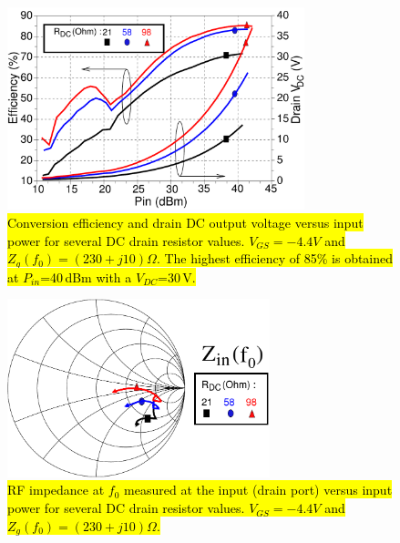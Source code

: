 \documentclass[journal]{IEEEtran}
\begin{document}
\begin{figure}[ht!]
\centering
\includegraphics[width=3.4in]{pdf/13.pdf}
\caption{\hl{Conversion efficiency and drain DC output voltage versus input power for several DC drain resistor values. $V_{GS}=-4.4V$ and $Z_g(f_0)=\left(230+j10\right)\Omega$. The highest efficiency of 85\% is obtained at $P_{in}$=40\,dBm with a $V_{DC}$=30\,V.}}
\label{Rd_sweep_final}
\end{figure}


\begin{figure}[ht!]
\centering
\includegraphics[width=3in]{pdf/14.pdf}
\caption{\hl{RF impedance at $f_0$ measured at the input (drain port) versus input power for several DC drain resistor values. $V_{GS}=-4.4V$ and $Z_g(f_0)=\left(230+j10\right)\Omega$.}}
\label{Rd_sweep_Zin}
\end{figure}



\end{document}
